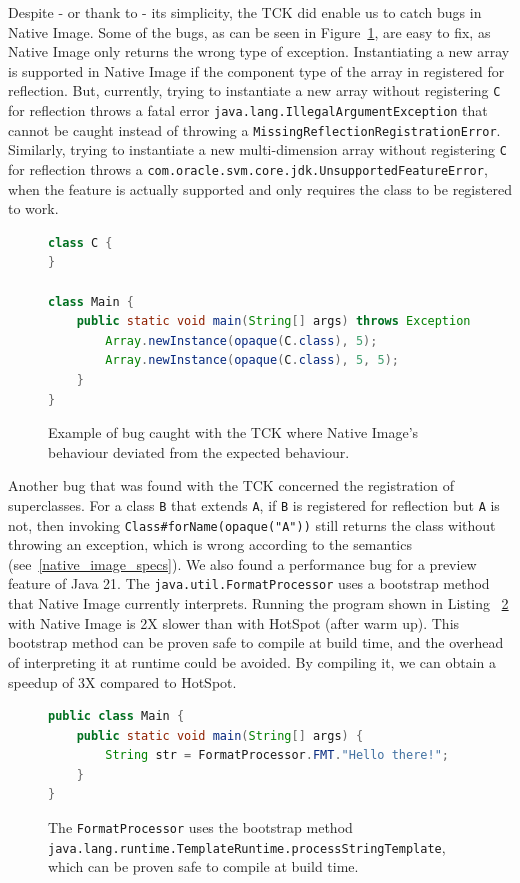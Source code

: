 Despite - or thank to - its simplicity, the TCK did enable us to catch bugs in Native Image. Some of the bugs, as can be seen in Figure~\ref{fig:new_multi_array_bug}, are easy to fix, as Native Image only returns the wrong type of exception.  
Instantiating a new array is supported in Native Image if the component type of the array in registered for reflection. But, currently, trying to instantiate a new array without registering \texttt{C} for reflection throws a fatal error \texttt{java.lang.IllegalArgumentException} that cannot be caught instead of throwing a \verb|MissingReflectionRegistrationError|. Similarly, trying to instantiate a new multi-dimension array without registering \texttt{C} for reflection throws a \texttt{com.oracle.svm.core.jdk.UnsupportedFeatureError}, when the feature is actually supported and only requires the class to be registered to work.

\begin{figure}[ht]
    \centering
\begin{lstlisting}[language=Java]
class C {
}

class Main {
    public static void main(String[] args) throws Exception {
        Array.newInstance(opaque(C.class), 5);
        Array.newInstance(opaque(C.class), 5, 5);
    }
}
\end{lstlisting}
    \caption{Example of bug caught with the TCK where Native Image's behaviour deviated from the expected behaviour.}
    \label{fig:new_multi_array_bug}
\end{figure}

Another bug that was found with the TCK concerned the registration of superclasses. For a class \verb|B| that extends \verb|A|, if \verb|B| is registered for reflection but \verb|A| is not, then invoking \verb|Class#forName(opaque("A"))| still returns the class without throwing an exception, which is wrong according to the semantics (see~\ref{native_image_specs}). 
We also found a performance bug for a preview feature of Java 21. The \verb|java.util.FormatProcessor| uses a bootstrap method that Native Image currently interprets. Running the program shown in Listing ~\ref{fig:format_processor} with Native Image is 2X slower than with HotSpot (after warm up). This bootstrap method can be proven safe to compile at build time, and the overhead of interpreting it at runtime could be avoided. By compiling it, we can obtain a speedup of 3X compared to HotSpot.

\begin{figure}[ht]
    \centering
\begin{lstlisting}[language=Java]
public class Main {
    public static void main(String[] args) {
        String str = FormatProcessor.FMT."Hello there!";
    }
}
\end{lstlisting}
    \caption{The \texttt{FormatProcessor} uses the bootstrap method \texttt{java.lang.runtime.TemplateRuntime.processStringTemplate}, which can be proven safe to compile at build time. }
    \label{fig:format_processor}
\end{figure}


